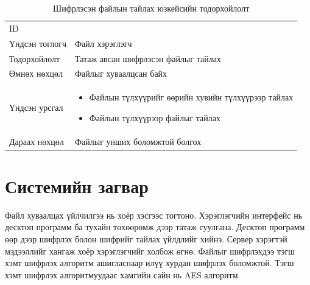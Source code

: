 \begin{table}[H]
    \footnotesize
    \centering
    \begin{tabularx}{\textwidth}{|>{\hsize=0.3\hsize}X|>{\hsize=0.7\hsize}X|}
        \hline
        \multicolumn{2}{|c|}{Шифрлэсэн файлын тайлах}        \\
        \hline
        ID             & 7                                   \\
        \hline
        Үндсэн тоглогч & Файл хэрэглэгч                      \\
        \hline
        Тодорхойлолт   & Татаж авсан шифрлэсэн файлыг тайлах \\
        \hline
        Өмнөх нөхцөл   & Файлыг хуваалцсан байх              \\
        \hline
        Үндсэн урсгал  &
        \begin{minipage}{\linewidth}
            \begin{itemize}
                \item Файлын түлхүүрийг өөрийн хувийн түлхүүрээр тайлах
                \item Файлын түлхүүрээр файлыг тайлах
            \end{itemize}
        \end{minipage}
        \\
        \hline
        Дараах нөхцөл  & Файлыг унших боломжтой болгох       \\
        \hline
    \end{tabularx}
    \caption{Шифрлэсэн файлын тайлах юзкейсийн тодорхойлолт}
\end{table}

\section{Системийн загвар}
Файл хуваалцах үйлчилгээ нь хоёр хэсгээс тогтоно. Хэрэглэгчийн интерфейс нь десктоп программ ба тухайн төхөөрөмж дээр татаж суулгана.
Десктоп программ өөр дээр шифрлэх болон шифрийг тайлах үйлдлийг хийнэ. Сервер хэрэгтэй мэдээллийг хангаж хоёр хэрэглэгчийг холбож өгнө. 
Файлыг шифрлэхдээ тэгш хэмт шифрлэх алгоритм ашигласнаар илүү хурдан шифрлэх боломжтой. Тэгш хэмт шифрлэх алгоритмуудаас хамгийн сайн нь AES алгоритм.


